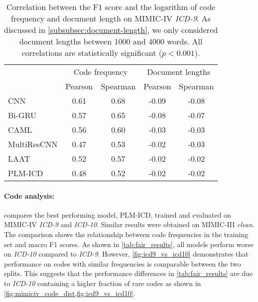 {\begin{table}[t]
    \centering
    \caption[Correlation between the F1 score and the logarithm of code frequency and document length on MIMIC-IV \textit{ICD-9}.]{Correlation between the F1 score and the logarithm of code frequency and document length on MIMIC-IV \textit{ICD-9}. As discussed in \cref{subsubsec:document-length}, we only considered document lengths between 1000 and 4000 words. All correlations are statistically significant ($p<0.001$).}
    \label{tab:correlations}
    \begin{tabular}{lcccc}
        \toprule
        & \multicolumn{2}{c}{Code frequency} & \multicolumn{2}{c}{Document lengths}\\
        \cmidrule(lr){2-3}\cmidrule(lr){4-5}
        & Pearson & Spearman & Pearson & Spearman \\
        \midrule
        CNN  & 0.61 & 0.68 & -0.09 & -0.08 \\
        Bi-GRU & 0.57 & 0.65 & -0.08 & -0.07 \\
        CAML & 0.56 & 0.60 & -0.03 & -0.03   \\
        MultiResCNN & 0.47 & 0.53 & -0.02 & -0.03  \\
        LAAT & 0.52 & 0.57 & -0.02 & -0.02 \\
        PLM-ICD & 0.48 & 0.52 & -0.02 & -0.02   \\
        \bottomrule
    \end{tabular}
\end{table}


\paragraph{Code analysis:}

 compares the best performing model, PLM-ICD, trained and evaluated on MIMIC-IV \textit{ICD-9} and \textit{ICD-10}. Similar results were obtained on MIMIC-III \textit{clean}.
The comparison shows the relationship between code frequencies in the training set and macro F1 scores. As shown in \cref{tab:fair_results}, all models perform worse on \textit{ICD-10} compared to \textit{ICD-9}. However, \cref{fig:icd9_vs_icd10} demonstrates that performance on codes with similar frequencies is comparable between the two splits. This suggests that the performance differences in \cref{tab:fair_results} are due to \textit{ICD-10} containing a higher fraction of rare codes as shown in \cref{fig:mimiciv_code_dist,fig:icd9_vs_icd10}.

}
